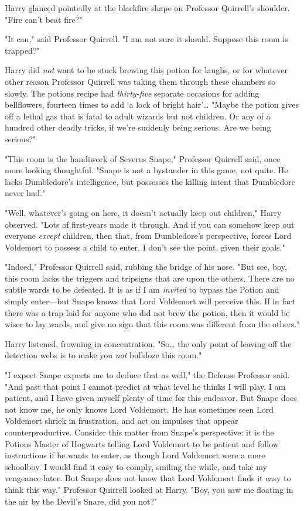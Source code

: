 Harry glanced pointedly at the blackfire shape on Professor Quirrell's 
shoulder. "Fire can't beat fire?"

"It can," said Professor Quirrell. "I am not sure it should. Suppose this room 
is trapped?"

Harry did \emph{not} want to be stuck brewing this potion for laughs, or for 
whatever other reason Professor Quirrell was taking them through these chambers 
so slowly. The potions recipe had \emph{thirty-five} separate occasions for 
adding bellflowers, fourteen times to add `a lock of bright hair'{\ldots} 
"Maybe the potion gives off a lethal gas that is fatal to adult wizards but not 
children. Or any of a hundred other deadly tricks, if we're suddenly being 
serious. Are we being serious?"

"This room is the handiwork of Severus Snape," Professor Quirrell said, once 
more looking thoughtful. "Snape is not a bystander in this game, not quite. He 
lacks Dumbledore's intelligence, but possesses the killing intent that 
Dumbledore never had."

"Well, whatever's going on here, it doesn't actually keep out children," Harry 
observed. "Lots of first-years made it through. And if you can somehow keep out 
everyone \emph{except} children, then that, from Dumbledore's perspective, 
forces Lord Voldemort to possess a child to enter. I don't see the point, given 
their goals."

"Indeed," Professor Quirrell said, rubbing the bridge of his nose. "But see, 
boy, this room lacks the triggers and tripsigns that are upon the others. There 
are no subtle wards to be defeated. It is as if I am \emph{invited} to bypass 
the Potion and simply enter---but Snape knows that Lord Voldemort will perceive 
this. If in fact there was a trap laid for anyone who did not brew the potion, 
then it would be wiser to lay wards, and give no sign that this room was 
different from the others."

Harry listened, frowning in concentration. "So{\ldots} the only point of 
leaving off the detection webs is to make you \emph{not} bulldoze this room."

"I expect Snape expects me to deduce that as well," the Defense Professor said. 
"And past that point I cannot predict at what level he thinks I will play. I am 
patient, and I have given myself plenty of time for this endeavor. But Snape 
does not know me, he only knows Lord Voldemort. He has sometimes seen Lord 
Voldemort shriek in frustration, and act on impulses that appear 
counterproductive. Consider this matter from Snape's perspective: it is the 
Potions Master of Hogwarts telling Lord Voldemort to be patient and follow 
instructions if he wants to enter, as though Lord Voldemort were a mere 
schoolboy. I would find it easy to comply, smiling the while, and take my 
vengeance later. But Snape does not know that Lord Voldemort finds it easy to 
think this way." Professor Quirrell looked at Harry. "Boy, you saw me floating 
in the air by the Devil's Snare, did you not?"

